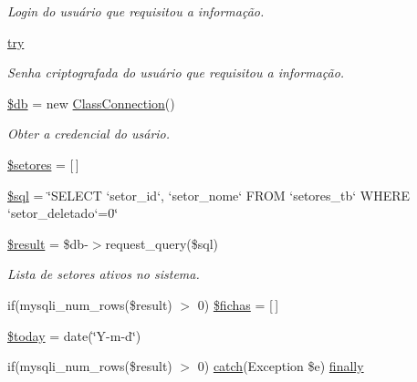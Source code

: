 \begin{DoxyCompactItemize}
\begin{DoxyCompactList}\small\item\em Login do usuário que requisitou a informação. \end{DoxyCompactList}\item 
\hyperlink{main_page_2painel_geral_2index_8php_abe4cc9788f52e49485473dc699537388}{try}
\begin{DoxyCompactList}\small\item\em Senha criptografada do usuário que requisitou a informação. \end{DoxyCompactList}\item 
\hyperlink{main_page_2painel_geral_2index_8php_a1fa3127fc82f96b1436d871ef02be319}{\$db} = new \hyperlink{class_class_connection}{Class\+Connection}()
\begin{DoxyCompactList}\small\item\em Obter a credencial do usário. \end{DoxyCompactList}\item 
\hyperlink{main_page_2painel_geral_2index_8php_af62a556436f10f703431108a1a8fc00f}{\$setores} = \mbox{[}$\,$\mbox{]}
\item 
\hyperlink{main_page_2painel_geral_2index_8php_a047170d6020a882807665812a27e2525}{\$sql} = \char`\"{}S\+E\+L\+E\+CT `setor\+\_\+id`, `setor\+\_\+nome` F\+R\+OM `setores\+\_\+tb` W\+H\+E\+RE `setor\+\_\+deletado`=0\char`\"{}
\item 
\hyperlink{main_page_2painel_geral_2index_8php_a112ef069ddc0454086e3d1e6d8d55d07}{\$result} = \$db-\/$>$request\+\_\+query(\$sql)
\begin{DoxyCompactList}\small\item\em Lista de setores ativos no sistema. \end{DoxyCompactList}\item 
if(mysqli\+\_\+num\+\_\+rows(\$result) $>$ 0) \hyperlink{main_page_2painel_geral_2index_8php_af7ab0d76cd5b7a6e7898359e07d3deac}{\$fichas} = \mbox{[}$\,$\mbox{]}
\item 
\hyperlink{main_page_2painel_geral_2index_8php_af1b7fb9d06cdc6d22c14741fc3cc185a}{\$today} = date(\char`\"{}Y-\/m-\/d\char`\"{})
\item 
if(mysqli\+\_\+num\+\_\+rows(\$result) $>$ 0) \hyperlink{imprimir_2ficha_2index_8php_a8104793004944f01dd070fc8b1ade3c4}{catch}(Exception \$e) \hyperlink{main_page_2painel_geral_2index_8php_af7cfe1f8cb9dba05c425311a444e3fb4}{finally}
\end{DoxyCompactItemize}


